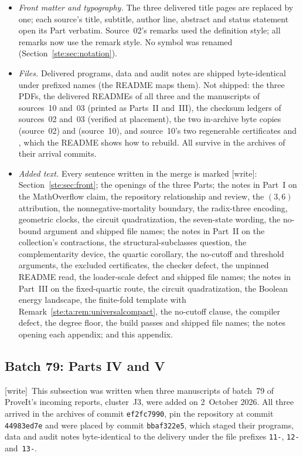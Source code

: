 \documentclass[11pt,letterpaper]{article}
\theoremstyle{definition}
\theoremstyle{remark}
\newcommand{\wtag}{\textup{[write]}}
\begin{document}
\begin{itemize}
\item \emph{Front matter and typography.} The three delivered title pages are replaced by one; each source's title, subtitle, author line, abstract and status statement open its Part verbatim. Source~02's remarks used the definition style; all remarks now use the remark style. No symbol was renamed (Section~\ref{ste:sec:notation}).
\item \emph{Files.} Delivered programs, data and audit notes are shipped byte-identical under prefixed names (the README maps them). Not shipped: the three PDFs, the delivered READMEs of all three and the manuscripts of sources~10 and~03 (printed as Parts~II and~III), the checksum ledgers of sources~02 and~03 (verified at placement), the two in-archive byte copies  (source~02) and  (source~10), and source~10's two regenerable certificates  and , which the README shows how to rebuild. All survive in the archives of their arrival commits.
\item \emph{Added text.} Every sentence written in the merge is marked \wtag: Section~\ref{ste:sec:front}; the openings of the three Parts; the notes in Part~I on the MathOverflow claim, the repository relationship and review, the $(3,6)$ attribution, the nonnegative-mortality boundary, the radix-three encoding, geometric clocks, the circuit quadratization, the seven-state wording, the no-bound argument and shipped file names; the notes in Part~II on the collection's contractions, the structural-subclasses question, the complementarity device, the quartic corollary, the no-cutoff and threshold arguments, the excluded certificates, the checker defect, the unpinned README read, the loader-scale defect and shipped file names; the notes in Part~III on the fixed-quartic route, the circuit quadratization, the Boolean energy landscape, the finite-fold template with Remark~\ref{ste:ta:rem:universalcompact}, the no-cutoff clause, the compiler defect, the degree floor, the build passes and shipped file names; the notes opening each appendix; and this appendix.
\end{itemize}

\subsection{Batch 79: Parts IV and V}\label{ste:app:provenance79}

\wtag\ This subsection was written when three manuscripts of batch~79 of ProveIt's incoming reports, cluster~J3, were added on 2~October 2026. All three arrived in the archives of commit \texttt{ef2fc7990}, pin the repository at commit \texttt{44983ed7e} and were placed by commit \texttt{bbaf322e5}, which staged their programs, data and audit notes byte-identical to the delivery under the file prefixes \texttt{11-}, \texttt{12-} and~\texttt{13-}.
\end{document}
